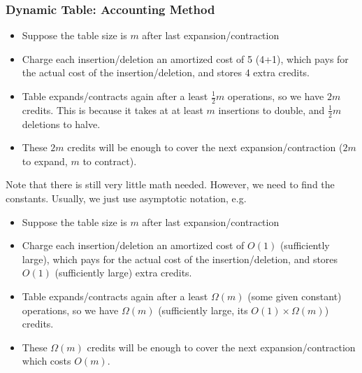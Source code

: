 \documentclass[../main/main.tex]{subfiles}
\begin{document}
\subsubsection{Dynamic Table: Accounting Method}
\begin{itemize}
	\item Suppose the table size is $m$ after last expansion/contraction
	\item Charge each insertion/deletion an amortized cost of 5 (4+1), which pays for the actual cost of the insertion/deletion, and stores 4 extra credits.
	\item Table expands/contracts again after a least $\frac{1}{2}m$ operations, so we have $2m$ credits. This is because it takes at at least  $m$ insertions to double, and  $\frac{1}{2}m$ deletions to halve. 
	\item These $2m$ credits will be enough to cover the next expansion/contraction ($2m$ to expand, $m$ to contract).
\end{itemize}
\begin{remark}
	Note that there is still very little math needed. However, we need to find the constants. Usually, we just use asymptotic notation, e.g. 
\begin{itemize}
	\item Suppose the table size is $m$ after last expansion/contraction
	\item Charge each insertion/deletion an amortized cost of $O(1)$ (sufficiently large), which pays for the actual cost of the insertion/deletion, and stores $O(1)$ (sufficiently large) extra credits.
	\item Table expands/contracts again after a least $\Omega(m)$ (some given constant) operations, so we have $\Omega(m)$ (sufficiently large, its $O(1)\times \Omega(m)$) credits. 
	\item These $\Omega(m)$ credits will be enough to cover the next expansion/contraction which costs $O(m)$.
\end{itemize}
\end{remark}
\end{document}
